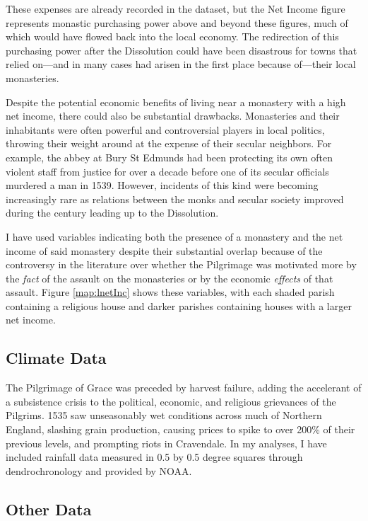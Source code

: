 \documentclass[12pt]{article}
\begin{document}
These expenses are already recorded in the dataset, but the Net Income figure represents monastic purchasing power above and beyond these figures, much of which would have flowed back into the local economy. The redirection of this purchasing power after the Dissolution could have been disastrous for towns that relied on---and in many cases had arisen in the first place because of---their local monasteries. 

Despite the potential economic benefits of living near a monastery with a high net income, there could also be substantial drawbacks. Monasteries and their inhabitants were often powerful and controversial players in local politics, throwing their weight around at the expense of their secular neighbors. For example, the abbey at Bury St Edmunds had been protecting its own often violent staff from justice for over a decade before one of its secular officials murdered a man in 1539.\autocite[99-100]{Clark2021} However, incidents of this kind were becoming increasingly rare as relations between the monks and secular society improved during the century leading up to the Dissolution.\autocite[278-9]{Clark2009}

I have used variables indicating both the presence of a monastery and the net income of said monastery despite their substantial overlap because of the controversy in the literature over whether the Pilgrimage was motivated more by the \emph{fact} of the assault on the monasteries or by the economic \emph{effects} of that assault. Figure \ref{map:lnetInc} shows these variables, with each shaded parish containing a religious house and darker parishes containing houses with a larger net income. 

\subsection{Climate Data}

The Pilgrimage of Grace was preceded by harvest failure, adding the accelerant of a subsistence crisis to the political, economic, and religious grievances of the Pilgrims. 1535 saw unseasonably wet conditions across much of Northern England, slashing grain production, causing prices to spike to over 200\% of their previous levels, and prompting riots in Cravendale.\autocite[57]{Davies1968} In my analyses, I have included rainfall data measured in 0.5 by 0.5 degree squares through dendrochronology and provided by NOAA.

\subsection{Other Data}
\end{document}
